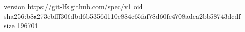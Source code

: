 version https://git-lfs.github.com/spec/v1
oid sha256:b8a273ebfff306dbd6b5356d110e884c65faf78d60fe4708adea2bb58743dcdf
size 196704
